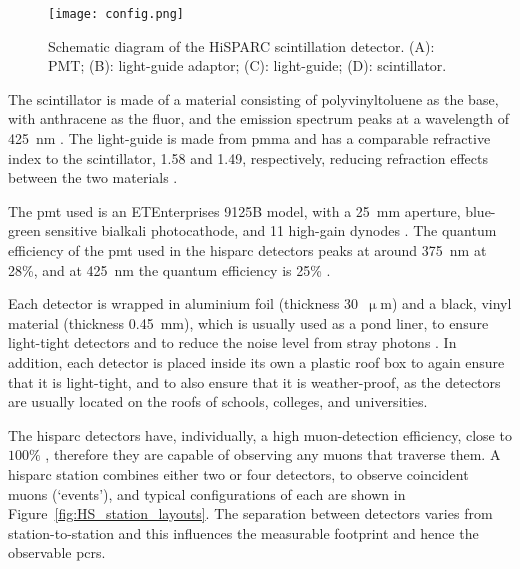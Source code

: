 \begin{figure}[ht!]
	\centering
	\texttt{[image: config.png]}
	\caption{Schematic diagram of the HiSPARC scintillation detector. (A): PMT; (B): light-guide adaptor; (C): light-guide; (D): scintillator.}
	\label{fig:HS_scintillator}
\end{figure}

The scintillator is made of a material consisting of polyvinyltoluene as the base, with anthracene as the fluor, and the emission spectrum peaks at a wavelength of 425~nm \citep{fokkema_hisparc_2012, bartels_hisparc_2012}. The light-guide is made from \gls{pmma} and has a comparable refractive index to the scintillator, 1.58 and 1.49, respectively, reducing refraction effects between the two materials \citep{van_dam_hisparc_2020}.

The \gls{pmt} used is an ETEnterprises 9125B model, with a 25~mm aperture,  blue-green sensitive bialkali photocathode, and 11 high-gain dynodes \citep{bartels_hisparc_2012,et_enterprises_data_2020}. The quantum efficiency of the \gls{pmt} used in the \gls{hisparc} detectors peaks at around 375~nm at 28\%, and at 425~nm the quantum efficiency is 25\% \citep{fokkema_hisparc_2012}. 

Each detector is wrapped in aluminium foil (thickness 30~$\upmu$m) and a black, vinyl material (thickness 0.45~mm), which is usually used as a pond liner, to ensure light-tight detectors and to reduce the noise level from stray photons \citep{van_dam_hisparc_2020}. In addition, each detector is placed inside its own a plastic roof box to again ensure that it is light-tight, and to also ensure that it is weather-proof, as the detectors are usually located on the roofs of schools, colleges, and universities.

The \gls{hisparc} detectors have, individually, a high muon-detection efficiency, close to $100\%$ \citep{fokkema_hisparc_2012, van_dam_hisparc_2020}, therefore they are capable of observing any muons that traverse them. A \gls{hisparc} station combines either two or four detectors, to observe coincident muons (`events'), and typical configurations of each are shown in Figure~\ref{fig:HS_station_layouts}. The separation between detectors varies from station-to-station and this influences the measurable footprint and hence the observable \glspl{pcr}.


